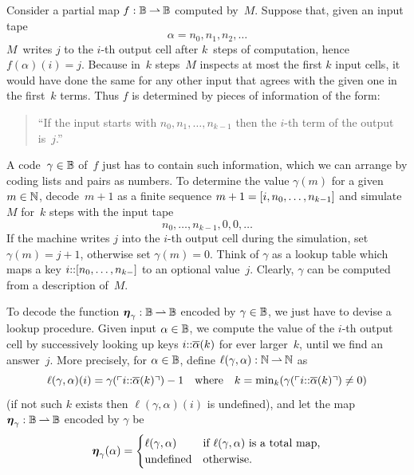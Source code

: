 Consider a partial map $f : \mathbb{B} \mathbin{\rightharpoonup} \mathbb{B}$ computed by~$M$.
Suppose that, given an input tape
%
\begin{equation*}
  \alpha = n_0, n_1, n_2, \ldots
\end{equation*}
%
$M$~writes $j$ to the $i$-th output cell after $k$~steps of computation,
hence $f(\alpha)(i) = j$. Because in~$k$ steps~$M$ inspects at most the first $k$ input cells, it would have done the same for any other input that agrees with the given one in the first~$k$ terms. Thus $f$ is determined by pieces of information of the form:
%
\begin{quote}
  ``If the input starts with $n_0, n_1, \ldots, n_{k-1}$ then the $i$-th term of the output is~$j$.''
\end{quote}
%
A code~$\gamma \in \mathbb{B}$ of~$f$ just has to contain such information, which we can arrange by coding lists and pairs as numbers. To determine the value $\gamma(m)$ for a given $m \in \mathbb{N}$, decode~$m + 1$ as a finite sequence $m + 1 = [i, n_0, \ldots, n_{k-1}]$ and simulate~$M$ for~$k$ steps with the input tape
%
\begin{equation*}
  n_0, \ldots, n_{k-1}, 0, 0, \ldots
\end{equation*}
%
If the machine writes $j$ into the $i$-th output cell during the simulation, set $\gamma(m) = j + 1$, otherwise set $\gamma(m) = 0$.
%
Think of $\gamma$ as a lookup table which maps a key $i {:}{:} [n_0, \ldots, n_{k-}]$ to an optional value~$j$.
%
Clearly, $\gamma$ can be computed from a description of~$M$.

To decode the function $\text{\boldmath{$\eta$}}_\gamma : \mathbb{B} \mathbin{\rightharpoonup} \mathbb{B}$ encoded by $\gamma \in \mathbb{B}$, we just have to devise a lookup procedure. Given input $\alpha \in \mathbb{B}$, we compute the value of the $i$-th output cell by successively looking up keys $i {:}{:} \overline{\alpha}(k)$ for ever larger~$k$, until we find an answer~$j$. More precisely,
for $\alpha \in \mathbb{B}$, define $\ell(\gamma, \alpha) : \mathbb{N} \mathbin{\rightharpoonup} \mathbb{N}$ as
%
\begin{equation*}
  \ell(\gamma, \alpha)(i) = \gamma(\ulcorner i {:}{:} \overline{\alpha}(k) \urcorner) - 1
  \quad\text{where}\quad
  k = \min\nolimits_k (\gamma(\ulcorner i {:}{:} \overline{\alpha}(k) \urcorner) \neq 0)
\end{equation*}
%
(if not such $k$ exists then $\ell(\gamma, \alpha)(i)$ is undefined), and let the map $\text{\boldmath{$\eta$}}_\gamma : \mathbb{B} \mathbin{\rightharpoonup} \mathbb{B}$ encoded by $\gamma$ be
%
\begin{equation}
  \label{eq:type2-encoding}
  \text{\boldmath{$\eta$}}_{\gamma}(\alpha) =
  \begin{cases}
    \ell(\gamma, \alpha) & \text{if $\ell(\gamma, \alpha)$ is a total map,} \\
    \text{undefined} & \text{otherwise.}
  \end{cases}
\end{equation}

